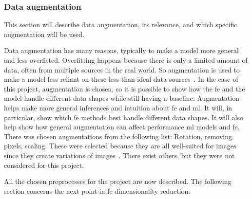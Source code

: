 \subsubsection{Data augmentation}\label{subsec:data-augmentation}
This section will describe data augmentation, its relevance, and which specific augmentation will be used.


Data augmentation has many reasons, typically to make a model more general and less overfitted. Overfitting happens because there is only a limited amount of data, often from multiple sources in the real world. So augmentation is used to make a model less reliant on these less-than-ideal data sources~\cite{MAHARANA202291}.
In the case of this project, augmentation is chosen, so it is possible to show how the \gls{fe} and the model handle different data shapes while still having a baseline. Augmentation helps make more general inferences and intuition about \gls{fe} and \gls{ml}. It will, in particular, show which \gls{fe} methods best handle different data shapes. It will also help show how general augmentation can affect performance \gls{ml} models and \gls{fe}.
There was chosen augmentations from the following list: Rotation, removing pixels, scaling. These were selected because they are all well-suited for images since they create variations of images~\cite{gonzalez2008digital}. There exist others, but they were not considered for this project. 
 

All the chosen preprocesses for the project are now described. The following section concerns the next point in \gls{fe} dimensionality reduction. 



